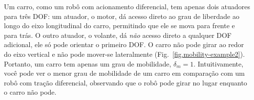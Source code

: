 
Um carro, como um robô com acionamento diferencial, tem apenas dois atuadores para três DOF: um atuador, o motor, dá acesso direto ao grau de liberdade ao longo do eixo longitudinal do carro, permitindo que ele se mova para frente e para trás. O outro atuador, o volante, dá \emph{não} acesso direto a qualquer DOF adicional, ele só pode orientar o primeiro DOF. O carro não pode girar ao redor do eixo vertical e não pode mover-se lateralmente (Fig.~\ref{fig.mobility-example2}). Portanto, um carro tem apenas um grau de mobilidade, $\delta_m = 1$. Intuitivamente, você pode ver o menor grau de mobilidade de um carro em comparação com um robô com tração diferencial, observando que o robô pode girar no lugar enquanto o carro não pode.

